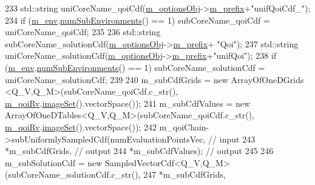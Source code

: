 \begin{DoxyCode}
233   std::string uniCoreName\_qoiCdf(\hyperlink{class_q_u_e_s_o_1_1_statistical_forward_problem_a4c286957fda7c134718422d9d4e4f1ca}{m\_optionsObj}->\hyperlink{class_q_u_e_s_o_1_1_statistical_forward_problem_options_adc3ea162cb9889b19128686aa657ab30}{m\_prefix}+\textcolor{stringliteral}{"unifQoiCdf\_"});
234   \textcolor{keywordflow}{if} (\hyperlink{class_q_u_e_s_o_1_1_statistical_forward_problem_ab8dc530366735e9ca11290e37f95996a}{m\_env}.\hyperlink{class_q_u_e_s_o_1_1_base_environment_ac0345f57e31ef7833e379ed972bd094d}{numSubEnvironments}() == 1) subCoreName\_qoiCdf = uniCoreName\_qoiCdf;
235 
236   std::string subCoreName\_solutionCdf(\hyperlink{class_q_u_e_s_o_1_1_statistical_forward_problem_a4c286957fda7c134718422d9d4e4f1ca}{m\_optionsObj}->\hyperlink{class_q_u_e_s_o_1_1_statistical_forward_problem_options_adc3ea162cb9889b19128686aa657ab30}{m\_prefix}+    \textcolor{stringliteral}{"Qoi"});
237   std::string uniCoreName\_solutionCdf(\hyperlink{class_q_u_e_s_o_1_1_statistical_forward_problem_a4c286957fda7c134718422d9d4e4f1ca}{m\_optionsObj}->\hyperlink{class_q_u_e_s_o_1_1_statistical_forward_problem_options_adc3ea162cb9889b19128686aa657ab30}{m\_prefix}+\textcolor{stringliteral}{"unifQoi"});
238   \textcolor{keywordflow}{if} (\hyperlink{class_q_u_e_s_o_1_1_statistical_forward_problem_ab8dc530366735e9ca11290e37f95996a}{m\_env}.\hyperlink{class_q_u_e_s_o_1_1_base_environment_ac0345f57e31ef7833e379ed972bd094d}{numSubEnvironments}() == 1) subCoreName\_solutionCdf = 
      uniCoreName\_solutionCdf;
239 
240   m\_subCdfGrids  = \textcolor{keyword}{new} ArrayOfOneDGrids <Q\_V,Q\_M>(subCoreName\_qoiCdf.c\_str(),
      \hyperlink{class_q_u_e_s_o_1_1_statistical_forward_problem_aa9ce415e5be95e04d6eea53c48fdea2c}{m\_qoiRv}.\hyperlink{class_q_u_e_s_o_1_1_base_vector_r_v_aa4dd2f036228eac1f945bacc7147a922}{imageSet}().vectorSpace());
241   m\_subCdfValues = \textcolor{keyword}{new} ArrayOfOneDTables<Q\_V,Q\_M>(subCoreName\_qoiCdf.c\_str(),
      \hyperlink{class_q_u_e_s_o_1_1_statistical_forward_problem_aa9ce415e5be95e04d6eea53c48fdea2c}{m\_qoiRv}.\hyperlink{class_q_u_e_s_o_1_1_base_vector_r_v_aa4dd2f036228eac1f945bacc7147a922}{imageSet}().vectorSpace());
242   m\_qoiChain->subUniformlySampledCdf(numEvaluationPointsVec, \textcolor{comment}{// input}
243                                      *m\_subCdfGrids,         \textcolor{comment}{// output}
244                                      *m\_subCdfValues);       \textcolor{comment}{// output}
245 
246   m\_subSolutionCdf = \textcolor{keyword}{new} SampledVectorCdf<Q\_V,Q\_M>(subCoreName\_solutionCdf.c\_str(),
247                                                           *m\_subCdfGrids,

\end{DoxyCode}
